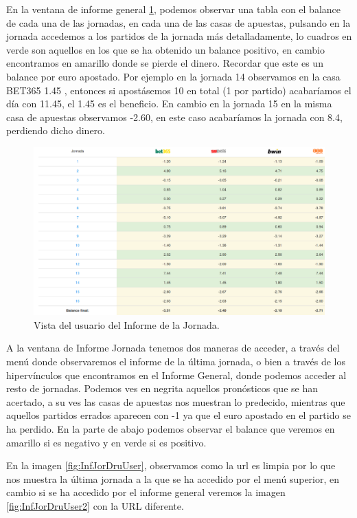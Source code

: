 En la ventana de informe general \ref{fig:InfGenDruUser}, podemos observar  una tabla con el balance de cada una de las jornadas, en cada una de las casas de apuestas, pulsando en la jornada accedemos a los partidos de la jornada más detalladamente, lo cuadros en verde son aquellos en los que se ha obtenido un balance positivo, en cambio encontramos en amarillo donde se pierde el dinero. Recordar que este es un balance por euro apostado. Por ejemplo en la jornada 14 observamos en la casa BET365 1.45 , entonces si apostásemos 10 en total (1 por partido) acabaríamos el día con 11.45, el 1.45 es el beneficio. En cambio en la jornada 15 en la misma casa de apuestas observamos -2.60, en este caso acabaríamos la jornada con 8.4, perdiendo dicho dinero.

\begin{figure}
\centering
\includegraphics[width=.9\textwidth]{img/drupal_inf_general_usuario}
\caption{Vista del usuario del Informe de la Jornada.}
\label{fig:InfGenDruUser}
\end{figure}

A la ventana de Informe Jornada tenemos dos maneras de acceder, a través del menú donde observaremos el informe de la última jornada, o bien a través de los hipervínculos que encontramos en el Informe General, donde podemos acceder al resto de jornadas.
Podemos ves en negrita aquellos pronósticos que se han acertado, a su ves las casas de apuestas nos muestran lo predecido, mientras que aquellos partidos errados aparecen con -1 ya que el euro apostado en el partido se ha perdido. En la parte de abajo podemos observar el balance que veremos en amarillo si es negativo y en verde si es positivo.

En la imagen \ref{fig:InfJorDruUser}, observamos como la url es limpia por lo que nos muestra la última jornada a la que se ha accedido por el menú superior, en cambio si se ha accedido por el informe general veremos la imagen \ref{fig:InfJorDruUser2} con la URL diferente.

